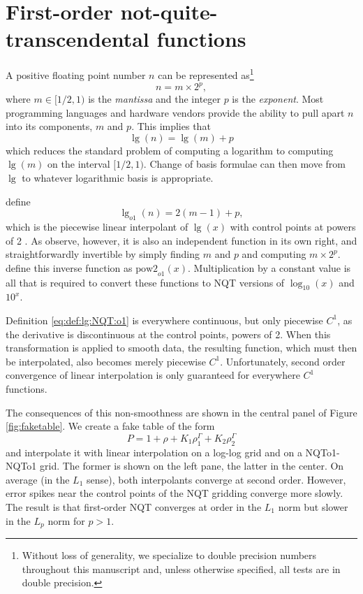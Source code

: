 \documentclass[linenumbers,twocolumn]{aastex631}
\begin{document}
\section{First-order not-quite-transcendental functions}
\label{sec:NQTo1}

A positive floating point number $n$ can be
represented as\footnote{Without loss of generality, we specialize to double precision numbers throughout this manuscript and, unless otherwise specified, all tests are in double precision.}
\begin{equation}
    \label{eq:float:representation}
    n = m \times 2^{p},
\end{equation}
where $m\in [1/2, 1)$ is the \textit{mantissa} and the integer $p$ is
the \textit{exponent}. Most programming languages and hardware vendors
provide the ability to pull apart $n$ into its components, $m$ and
$p$.  This implies that
\begin{equation}
  \label{eq:approx:log}
  \lg(n) = \lg(m) + p
\end{equation}
which reduces the standard problem of computing a logarithm to
computing $\lg(m)$ on the interval $[1/2, 1)$. Change of basis
formulae can then move from $\lg$ to whatever logarithmic basis is
appropriate.

\citet{NQTo1} define  
\begin{equation}
  \label{eq:def:lg:NQT:o1}
  \lg_{o1}(n) = 2 (m - 1) + p,
\end{equation}
which is the piecewise linear interpolant of $\lg(x)$ with control points at powers of 2 \citep{Hall}.  As \citet{NQTo1} observe, however, it is also an independent function in its own right, and straightforwardly invertible by simply finding $m$ and $p$ and computing $m \times
2^p$. \citet{NQTo1} define this inverse function as $\text{pow2}_{o1}(x)$. Multiplication by a constant value is all that is required to convert these functions to NQT versions of $\log_{10}(x)$ and $10^x$.

Definition \eqref{eq:def:lg:NQT:o1} is everywhere continuous, but only piecewise $C^1$, as the derivative is discontinuous at the control points, powers of 2. When this transformation is applied to smooth data, the resulting function, which must then be interpolated, also becomes merely piecewise $C^1$. Unfortunately, second order convergence of linear interpolation is only guaranteed for everywhere $C^1$ functions.

The consequences of this non-smoothness are shown in the central panel of Figure \ref{fig:faketable}. We create a fake table of the form
\begin{equation}
  \label{eq:synthetic:table}
  P = 1 + \rho + K_1 \rho^\Gamma_1 + K_2 \rho^\Gamma_2
\end{equation}
and interpolate it with linear interpolation on a log-log grid and on a NQTo1-NQTo1 grid. The former is shown on the left pane, the latter in the center. On average (in the $L_1$ sense), both interpolants converge at second order. However, error spikes near the control points of the NQT gridding converge more slowly. The result is that first-order NQT converges at order in the $L_1$ norm but slower in the $L_p$ norm for $p>1$.
\end{document}
